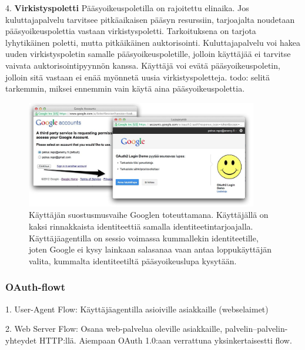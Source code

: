 \documentclass[finnish,gradu]{tktltiki}
\begin{document}
  4. \textbf{Virkistyspoletti}
  Pääsyoikeuspoletilla on rajoitettu elinaika. Jos kuluttajapalvelu tarvitsee pitkäaikaisen pääsyn resurssiin, tarjoajalta noudetaan pääsyoikeuspolettia vastaan virkistyspoletti. Tarkoituksena on tarjota lyhytikäinen poletti, mutta pitkäikäinen auktorisointi. Kuluttajapalvelu voi hakea uuden virkistyspoletin samalle pääsyoikeuspoletille, jolloin käyttäjää ei tarvitse vaivata auktorisointipyynnön kanssa. Käyttäjä voi evätä pääsyoikeuspoletin, jolloin sitä vastaan ei enää myönnetä uusia virkistyspoletteja.    todo: selitä tarkemmin, miksei ennemmin vain käytä aina pääsyoikeuspolettia. %



  \begin{figure}
    \centering
    \includegraphics[width=0.9\textwidth]{images/google_id_and_user_consent.jpg}
    \caption{Käyttäjän suostusmusvaihe Googlen toteuttamana. Käyttäjällä on kaksi rinnakkaista identiteettiä samalla identiteetintarjoajalla. Käyttäjäagentilla on sessio voimassa kummallekin identiteetille, joten Google ei kysy lainkaan salasanaa vaan antaa loppukäyttäjän valita, kummalta identiteetiltä pääsyoikeuslupa kysytään.}
    \label{fig:google_id_and_user_consent}
  \end{figure}





  \subsubsection{OAuth-flowt} %
  \label{ssub:oauth_flowt}

  1. User-Agent Flow: Käyttäjäagentilla asioiville asiakkaille (webselaimet)

  2. Web Server Flow: Osana web-palvelua oleville asiakkaille, palvelin--palvelin-yhteydet HTTP:llä. Aiempaan OAuth 1.0:aan verrattuna yksinkertaisestti flow.
\end{document}
